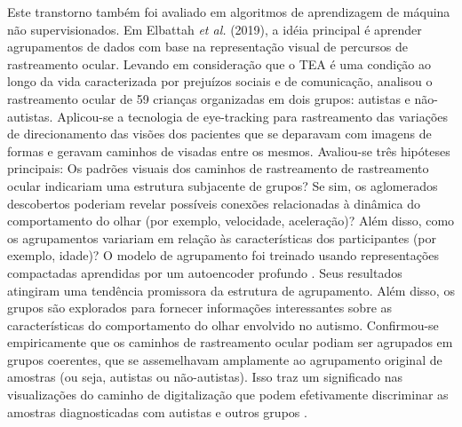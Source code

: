 \documentclass{template/sig-alternate-05-2015}
\begin{document}
Este transtorno também foi avaliado em algoritmos de aprendizagem de
máquina não supervisionados. Em Elbattah \textit{et al.} (2019), a
idéia principal é aprender agrupamentos de dados com base na
representação visual de percursos de rastreamento ocular. Levando em
consideração que o TEA é uma condição ao longo da vida caracterizada
por prejuízos sociais e de comunicação, analisou o rastreamento ocular
de 59 crianças organizadas em dois grupos: autistas e
não-autistas. Aplicou-se a tecnologia de eye-tracking para
rastreamento das variações de direcionamento das visões dos pacientes
que se deparavam com imagens de formas e geravam caminhos de visadas
entre os mesmos. Avaliou-se três hipóteses principais: Os padrões
visuais dos caminhos de rastreamento de rastreamento ocular indicariam
uma estrutura subjacente de grupos?  Se sim, os aglomerados
descobertos poderiam revelar possíveis conexões relacionadas à
dinâmica do comportamento do olhar (por exemplo, velocidade,
aceleração)? Além disso, como os agrupamentos variariam em relação às
características dos participantes (por exemplo, idade)? O modelo de
agrupamento foi treinado usando representações compactadas aprendidas
por um autoencoder profundo \cite{Albuquerque:2018}. Seus resultados
atingiram uma tendência promissora da estrutura de agrupamento. Além
disso, os grupos são explorados para fornecer informações
interessantes sobre as características do comportamento do olhar
envolvido no autismo. Confirmou-se empiricamente que os caminhos de
rastreamento ocular podiam ser agrupados em grupos coerentes, que se
assemelhavam amplamente ao agrupamento original de amostras (ou seja,
autistas ou não-autistas). Isso traz um significado nas visualizações
do caminho de digitalização que podem efetivamente discriminar as
amostras diagnosticadas com autistas e outros grupos
\cite{Elbattah:2019}.
\end{document}
